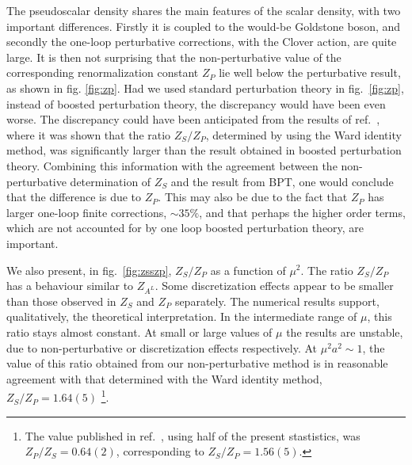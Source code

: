 
The pseudoscalar density
shares the  main features of the scalar density, with two
important differences. Firstly  it is coupled to the would-be Goldstone
boson, and secondly the one-loop
perturbative corrections, with the Clover action, are quite large.
 It is then not
surprising that the non-perturbative value of the corresponding renormalization
constant $Z_P$ lie well below the perturbative result, as shown in fig.
 \ref{fig:zp}.
 Had we used standard perturbation theory in fig.\ \ref{fig:zp},
instead of boosted perturbation theory, the discrepancy would
have been even worse. The discrepancy could have been anticipated from the
results of ref.\ \cite{wi}, where it was shown that the ratio $Z_S/Z_P$,
determined by using the  Ward identity method, was significantly larger than
the result
obtained in boosted perturbation theory. Combining this information
with the agreement between the non-perturbative determination of $Z_S$ and
the result from BPT, one would conclude that the difference is due to
$Z_P$. This may also be due to  the fact that $Z_P$ has
larger one-loop finite corrections, $\sim 35 \%$,
 and that perhaps the  higher order terms, which are not accounted for by
one loop boosted perturbation theory,
are important.

We also present, in fig.\ \ref{fig:zsszp}, $Z_S/Z_P$ as a function of $\mu^2$.
The ratio $Z_S/Z_P$ has a behaviour similar to $Z_{A^L}$. Some discretization
effects appear to be  smaller than those observed in $Z_S$ and $Z_P$
separately.
The numerical results support, qualitatively, the theoretical
interpretation. In the intermediate range of $\mu$, this ratio stays almost
constant.  At small or large values of $\mu$ the results are
unstable, due to non-perturbative or discretization effects respectively.
 At
$\mu^2 a^2 \sim 1 $, the value of this ratio obtained from our
non-perturbative method  is in reasonable agreement with that determined
with the Ward identity method, $Z_S/Z_P=1.64(5)$ \cite{wi}\footnote
{The value published in ref.\ \cite{wi}, using half of the
present stastistics,  was $Z_P/Z_S=0.64(2)$,
corresponding to $Z_S/Z_P=1.56(5)$.}.
